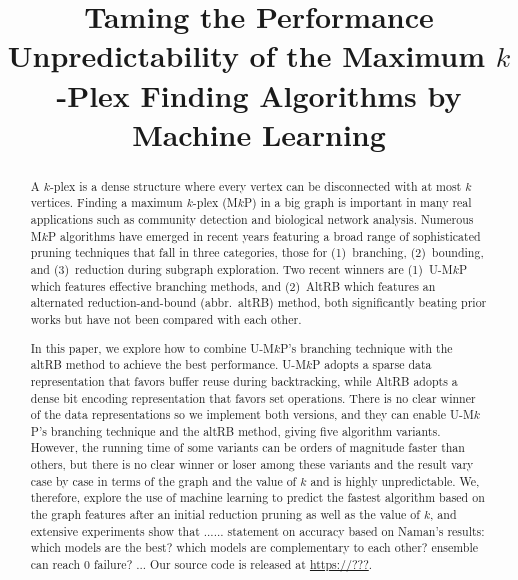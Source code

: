 \documentclass[sigconf,anonymous,review]{acmart}
\title{Taming the Performance Unpredictability of the Maximum $k$-Plex Finding Algorithms by Machine Learning}
\begin{document}
\begin{abstract}
A $k$-plex is a dense structure where every vertex can be disconnected with at most $k$ vertices. Finding a maximum $k$-plex (M$k$P) in a big graph is important in many real applications such as community detection and biological network analysis. Numerous M$k$P algorithms have emerged in recent years featuring a broad range of sophisticated pruning techniques that fall in three categories, those for (1)~branching, (2)~bounding, and (3)~reduction during subgraph exploration. Two recent winners are (1)~U-M$k$P which features effective branching methods, and (2)~AltRB which features an alternated reduction-and-bound (abbr.\ altRB) method, both significantly beating prior works but have not been compared with each other. 

In this paper, we explore how to combine U-M$k$P's branching technique with the altRB method to achieve the best performance. U-M$k$P adopts a sparse data representation that favors buffer reuse during backtracking, while AltRB adopts a dense bit encoding representation that favors set operations. There is no clear winner of the data representations so we implement both versions, and they can enable U-M$k$P's branching technique and the altRB method, giving five algorithm variants. However, the running time of some variants can be orders of magnitude faster than others, but there is no clear winner or loser among these variants and the result vary case by case in terms of the graph and the value of $k$ and is highly unpredictable. We, therefore, explore the use of machine learning to predict the fastest algorithm based on the graph features after an initial reduction pruning as well as the value of $k$, and extensive experiments show that {\color{red} ...... statement on accuracy based on Naman's results: which models are the best? which models are complementary to each other? ensemble can reach 0 failure?  ... Our source code is released at \url{https://???}.}
\end{abstract}
\maketitle

\vspace{-1mm}
\end{document}
